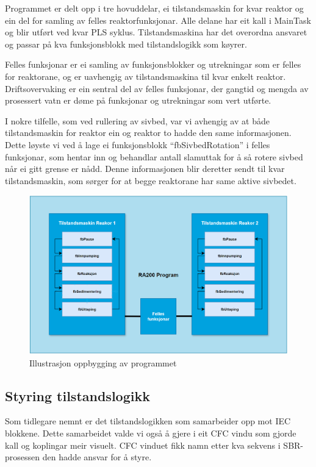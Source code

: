 Programmet er delt opp i tre hovuddelar, ei tilstandsmaskin for kvar reaktor og ein del for samling av felles reaktorfunksjonar.
Alle delane har eit kall i MainTask og blir utført ved kvar \gls{PLS} syklus. Tilstandsmaskina har det overordna ansvaret og passar på kva 
funksjonsblokk med tilstandslogikk som køyrer.

Felles funksjonar er ei samling av funksjonsblokker og utrekningar som er felles for reaktorane, og er uavhengig av tilstandsmaskina til kvar enkelt reaktor.
Driftsovervaking er ein sentral del av felles funksjonar, der gangtid og mengda av prosessert vatn er døme på funksjonar og utrekningar som vert utførte.

I nokre tilfelle, som ved rullering av sivbed, var vi avhengig av at både tilstandsmaskin for reaktor ein og reaktor to hadde den same informasjonen.
Dette løyste vi ved å lage ei funksjonsblokk ``fbSivbedRotation'' i felles funksjonar, som hentar inn og behandlar antall slamuttak for å så rotere sivbed når ei gitt grense er nådd.
Denne informasjonen blir deretter sendt til kvar tilstandsmaskin, som sørger for at begge reaktorane har same aktive sivbedet.

\begin{figure}[htbp]
    \centering
    \includegraphics[width=1\textwidth]{Figurar/Oppbygging_Program.png}
    \caption{Illustrasjon oppbygging av programmet}\label{fig:OppbyggingProgram}
\end{figure}

\newpage

\subsection{Styring tilstandslogikk}

Som tidlegare nemnt er det tilstandslogikken som samarbeider opp mot \gls{IEC} blokkene. Dette samarbeidet valde vi også å gjere i eit
\gls{CFC} vindu som gjorde kall og koplingar meir visuelt. \gls{CFC} vinduet fikk namn etter kva sekvens i \gls{SBR}-prosessen
den hadde ansvar for å styre. 

